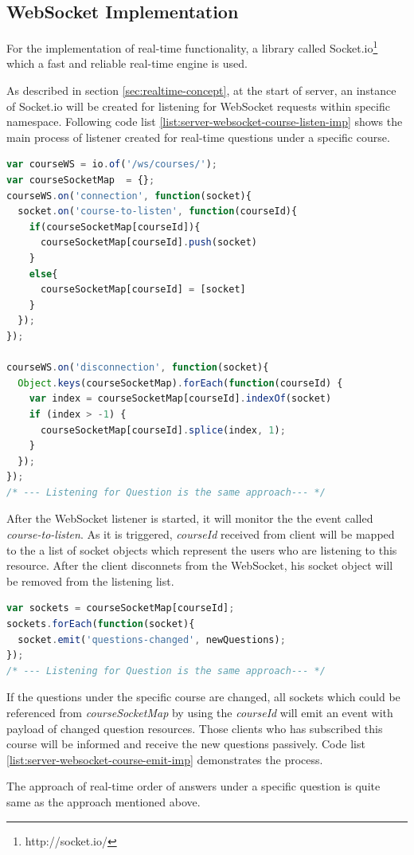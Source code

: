\subsection{WebSocket Implementation}
For the implementation of real-time functionality, a library called Socket.io\footnote{http://socket.io/} which a fast and reliable real-time engine is used. 

As described in section \ref{sec:realtime-concept}, at the start of server, an instance of Socket.io will be created for listening for WebSocket requests within specific namespace. Following code list \ref{list:server-websocket-course-listen-imp} shows the main process of listener created for real-time questions under a specific course.

\begin{lstlisting}[language=JavaScript, caption=Server starts listening for requests over WebSocket protocol , label={list:server-websocket-course-listen-imp}]
var courseWS = io.of('/ws/courses/');
var courseSocketMap  = {};
courseWS.on('connection', function(socket){
  socket.on('course-to-listen', function(courseId){
    if(courseSocketMap[courseId]){
      courseSocketMap[courseId].push(socket)
    }
    else{
      courseSocketMap[courseId] = [socket]
    }
  });
});

courseWS.on('disconnection', function(socket){
  Object.keys(courseSocketMap).forEach(function(courseId) {
    var index = courseSocketMap[courseId].indexOf(socket)
    if (index > -1) {
      courseSocketMap[courseId].splice(index, 1);
    }
  });
});
/* --- Listening for Question is the same approach--- */
\end{lstlisting}

After the WebSocket listener is started, it will monitor the the event called \textit{course-to-listen}. As it is triggered, \textit{courseId} received from client will be mapped to the a list of socket objects which represent the users who are listening to this resource. After the client disconnets from the WebSocket, his socket object will be removed from the listening list. 

\begin{lstlisting}[language=JavaScript, caption=Server starts listening for requests over WebSocket protocol , label={list:server-websocket-course-emit-imp}]
var sockets = courseSocketMap[courseId];
sockets.forEach(function(socket){
  socket.emit('questions-changed', newQuestions);
});
/* --- Listening for Question is the same approach--- */
\end{lstlisting}

If the questions under the specific course are changed, all sockets which could be referenced from \textit{courseSocketMap} by using the \textit{courseId} will emit an event with payload of changed question resources. Those clients who has subscribed this course will be informed and receive the new questions passively. Code list \ref{list:server-websocket-course-emit-imp} demonstrates the process.

The approach of real-time order of answers under a specific question is quite same as the approach mentioned above.